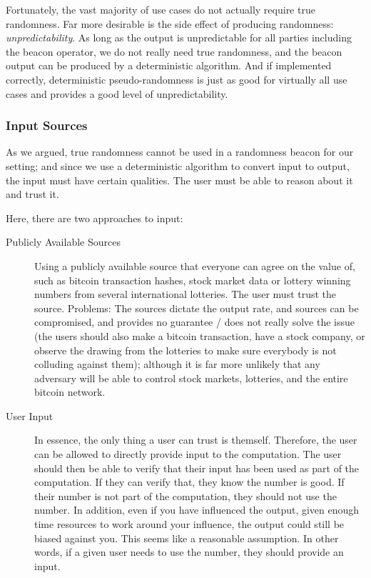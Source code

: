 Fortunately, the vast majority of use cases do not actually require true randomness.
Far more desirable is the side effect of producing randomness: \emph{unpredictability}.
As long as the output is unpredictable for all parties including the beacon operator, we do not really need true randomness, and the beacon output can be produced by a deterministic algorithm.
And if implemented correctly, deterministic pseudo-randomness is just as good for virtually all use cases and provides a good level of unpredictability.

\subsubsection{Input Sources}
As we argued, true randomness cannot be used in a randomness beacon for our setting;
and since we use a deterministic algorithm to convert input to output, the input must have certain qualities.
The user must be able to reason about it and trust it.

Here, there are two approaches to input:

\begin{description}
    \item[Publicly Available Sources] Using a publicly available source that everyone can agree on the value of, such as bitcoin transaction hashes, stock market data or lottery winning numbers from several international lotteries.
The user must trust the source.
Problems: The sources dictate the output rate, and sources can be compromised, and provides no guarantee / does not really solve the issue (the users should also make a bitcoin transaction, have a stock company, or observe the drawing from the lotteries to make sure everybody is not colluding against them); although it is far more unlikely that any adversary will be able to control stock markets, lotteries, and the entire bitcoin network.

    \item[User Input] In essence, the only thing a user can trust is themself.
Therefore, the user can be allowed to directly provide input to the computation.
The user should then be able to verify that their input has been used as part of the computation.
If they can verify that, they know the number is good.
If their number is not part of the computation, they should not use the number.
 In addition, even if you have influenced the output, given enough time resources to work around your influence, the output could still be biased against you.
This seems like a reasonable assumption.
In other words, if a given user needs to use the number, they should provide an input.

\end{description}

